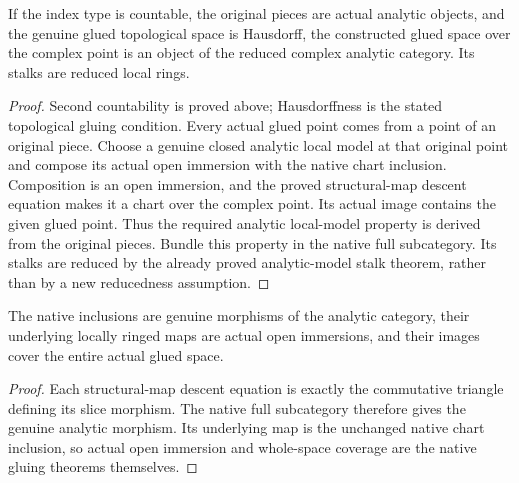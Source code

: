 \begin{theorem}
\label{hir:reduced-analytic-glue-object}
If the index type is countable, the original pieces are actual analytic
objects, and the genuine glued topological space is Hausdorff, the
constructed glued space over the complex point is an object of the
reduced complex analytic category. Its stalks are reduced local rings.
\leanok
\end{theorem}
\begin{proof}
Second countability is proved above; Hausdorffness is the stated
topological gluing condition. Every actual glued point comes from a
point of an original piece. Choose a genuine closed analytic local
model at that original point and compose its actual open immersion
with the native chart inclusion. Composition is an open immersion,
and the proved structural-map descent equation makes it a chart over
the complex point. Its actual image contains the given glued point.
Thus the required analytic local-model property is derived from the
original pieces. Bundle this property in the native full subcategory.
Its stalks are reduced by the already proved analytic-model stalk
theorem, rather than by a new reducedness assumption.
\end{proof}

\begin{theorem}
\label{hir:reduced-analytic-glue-chart-morphisms}
The native inclusions are genuine morphisms of the analytic category,
their underlying locally ringed maps are actual open immersions, and
their images cover the entire actual glued space.
\leanok
\end{theorem}
\begin{proof}
Each structural-map descent equation is exactly the commutative
triangle defining its slice morphism. The native full subcategory
therefore gives the genuine analytic morphism. Its underlying map is
the unchanged native chart inclusion, so actual open immersion and
whole-space coverage are the native gluing theorems themselves.
\end{proof}

